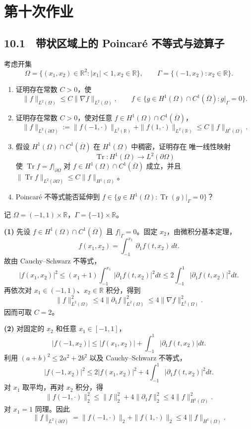 \section{第十次作业}

\subsection*{10.1　带状区域上的 Poincar\'e 不等式与迹算子}

\begin{problem}
考虑开集
\[
 \Omega=\{(x_1,x_2)\in\mathbb R^2:|x_1|<1, x_2\in\mathbb R\},
 \qquad \Gamma=\{(-1,x_2):x_2\in\mathbb R\}.
\]
\begin{enumerate}
 \item 证明存在常数 $C>0$，使
 \[
  \|f\|_{L^2(\Omega)}\le C\|\nabla f\|_{L^2(\Omega)},
  \qquad
  f\in\{g\in H^1(\Omega)\cap C^1(\overline\Omega):g|_\Gamma=0\}.
 \]
 \item 证明存在常数 $C>0$，使对任意 $f\in H^1(\Omega)\cap C^1(\overline\Omega)$，
 \[
  \|f\|_{L^2(\partial\Omega)}
  :=\|f(-1,\cdot)\|_{L^2(\mathbb R)}+\|f(1,\cdot)\|_{L^2(\mathbb R)}
  \le C\|f\|_{H^1(\Omega)}.
 \]
 \item 假设 $H^1(\Omega)\cap C^1(\overline\Omega)$ 在 $H^1(\Omega)$ 中稠密，证明存在
 唯一线性映射
 \[
  \operatorname{Tr}:H^1(\Omega)\to L^2(\partial\Omega)
 \]
 使 $\operatorname{Tr}f=f|_{\partial\Omega}$ 对
 $f\in H^1(\Omega)\cap C^1(\overline\Omega)$ 成立，并且
 $\|\operatorname{Tr}f\|_{L^2(\partial\Omega)}\le C\|f\|_{H^1(\Omega)}$。
 \item Poincar\'e 不等式能否延伸到
 $f\in\{g\in H^1(\Omega):\operatorname{Tr}(g)|_\Gamma=0\}$？
\end{enumerate}
\end{problem}

记 $\Omega=(-1,1)\times\mathbb R$，$\Gamma=\{-1\}\times\mathbb R$。

\textbf{(1)} 先设 $f\in H^1(\Omega)\cap C^1(\overline\Omega)$ 且 $f|_\Gamma=0$。固定 $x_2$，由微积分基本定理，
\[
 f(x_1,x_2)=\int_{-1}^{x_1}\partial_1f(t,x_2)\,dt .
\]
故由 Cauchy--Schwarz 不等式，
\[
 |f(x_1,x_2)|^2
 \le (x_1+1)\int_{-1}^{x_1}|\partial_1f(t,x_2)|^2dt
 \le 2\int_{-1}^{1}|\partial_1f(t,x_2)|^2dt .
\]
再依次对 $x_1\in(-1,1)$、$x_2\in\mathbb R$ 积分，得到
\[
 \|f\|_{L^2(\Omega)}^2\le4\|\partial_1f\|_{L^2(\Omega)}^2
 \le4\|\nabla f\|_{L^2(\Omega)}^2.
\]
因而可取 $C=2$。

\textbf{(2)} 对固定的 $x_2$ 和任意 $x_1\in[-1,1]$，
\[
 |f(-1,x_2)|\le |f(x_1,x_2)|+
 \int_{-1}^{1}|\partial_1f(t,x_2)|dt.
\]
利用 $(a+b)^2\le2a^2+2b^2$ 以及 Cauchy--Schwarz 不等式，
\[
 |f(-1,x_2)|^2
 \le2|f(x_1,x_2)|^2+4\int_{-1}^{1}|\partial_1f(t,x_2)|^2dt.
\]
对 $x_1$ 取平均，再对 $x_2$ 积分，得
\[
 \|f(-1,\cdot)\|_2^2\le \|f\|_2^2+4\|\partial_1f\|_2^2
 \le4\|f\|_{H^1(\Omega)}^2.
\]
对 $x_1=1$ 同理。因此
\[
 \|f\|_{L^2(\partial\Omega)}
 =\|f(-1,\cdot)\|_2+\|f(1,\cdot)\|_2
 \le4\|f\|_{H^1(\Omega)}.
\]

